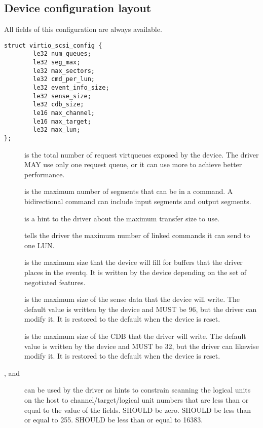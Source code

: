 \subsection{Device configuration layout}\label{sec:Device Types / SCSI Host Device / Device configuration layout}

  All fields of this configuration are always available.

\begin{lstlisting}
struct virtio_scsi_config {
        le32 num_queues;
        le32 seg_max;
        le32 max_sectors;
        le32 cmd_per_lun;
        le32 event_info_size;
        le32 sense_size;
        le32 cdb_size;
        le16 max_channel;
        le16 max_target;
        le32 max_lun;
};
\end{lstlisting}

\begin{description}
\item[] is the total number of request virtqueues exposed by
    the device. The driver MAY use only one request queue,
    or it can use more to achieve better performance.

\item[] is the maximum number of segments that can be in a
    command. A bidirectional command can include  input
    segments and  output segments.

\item[] is a hint to the driver about the maximum transfer
    size to use.

\item[] tells the driver the maximum number of
    linked commands it can send to one LUN.

\item[] is the maximum size that the device will fill
    for buffers that the driver places in the eventq. It is
    written by the device depending on the set of negotiated
    features.

\item[] is the maximum size of the sense data that the
    device will write. The default value is written by the device
    and MUST be 96, but the driver can modify it. It is
    restored to the default when the device is reset.

\item[] is the maximum size of the CDB that the driver will
    write. The default value is written by the device and MUST
    be 32, but the driver can likewise modify it. It is
    restored to the default when the device is reset.

\item[,  and ] can be
    used by the driver as hints to constrain scanning the logical units
    on the host to channel/target/logical unit numbers that are less than
    or equal to the value of the fields.   SHOULD
    be zero.   SHOULD be less than or equal to 255.
     SHOULD be less than or equal to 16383.
\end{description}

